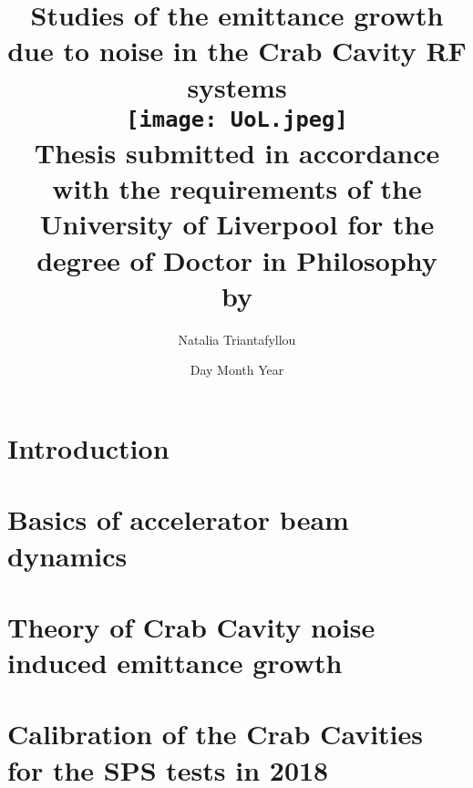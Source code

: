 \documentclass[12pt,twoside]{report} %
\begin{document}
\frontmatter
\title{
{Studies of the emittance growth due to noise in the Crab Cavity RF systems}\\
{\texttt{[image: UoL.jpeg]}} \\
{\large Thesis submitted in accordance with the requirements of the University of Liverpool for the degree of Doctor in Philosophy \\ by}
}
\author{ Natalia Triantafyllou}
\date{Day Month Year}
\maketitle
\newpage




\tableofcontents


\listoffigures
{}
\listoftables
{}


\thispagestyle{plain} %

\listofsymbols
{}

\newpage


\printnomenclature
{}



\mainmatter

\chapter{Introduction}


\chapter{Basics of accelerator beam dynamics}\label{Ch:theory}


\chapter{Theory of Crab Cavity noise induced emittance growth}\label{Ch:CC_noise_theory}


\chapter{Calibration of the Crab Cavities for the SPS tests in 2018}\label{Ch:CC_set_up}

\end{document}
